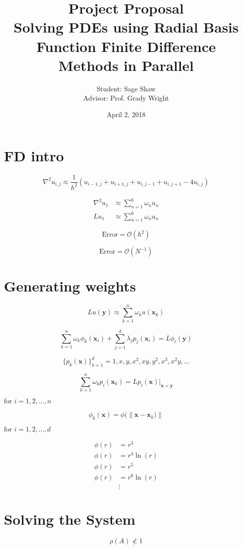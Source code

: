 \documentclass[12pt]{article}
\title{Project Proposal\\ \large Solving PDEs using Radial Basis Function Finite Difference Methods in Parallel}
\author{Student: Sage Shaw\\ Advisor: Prof. Grady Wright}
\date{April 2, 2018}
\newcommand{\norm}[1]{\left\lVert#1\right\rVert}
\let\vec\mathbf
\begin{document}
	\thispagestyle{empty}
	
	
\section{FD intro}

$$
\nabla^2u_{i,j} \approx \frac{1}{h^2}\left( u_{i-1,j} + u_{i+1, j} + u_{i, j-1} +u_{i, j+1} - 4u_{i,j} \right)
$$

\begin{align*}
	\nabla^2u_{1} & \approx \sum_{n=1}^6 \omega_n u_n \\
	Lu_{1} & \approx \sum_{n=1}^6 \omega_n u_n
\end{align*}

$$
\text{Error} = \mathcal{O}(h^2)
$$

$$
\text{Error} = \mathcal{O}(N^{-1})
$$



\section{Generating weights}
$$
Lu(\vec{y}) \approx \sum_{k=1}^n \omega_k u(\vec{x}_k)
$$

$$
\sum\limits_{k=1}^n \omega_k\phi_k(\vec{x}_i) + \sum\limits_{j=1}^d \lambda_j p_j(\vec{x}_i) = L\phi_i(\vec{y}) 
$$

$$
\{p_k(\vec{x})\}_{k=1}^d = 1, x, y, x^2, xy, y^2, x^3, x^2y, \dots
$$

$$
\sum\limits_{k=1}^n \omega_k p_i(\vec{x}_k) = Lp_i(\vec{x})\vert_{\vec{x}=\vec{y}}
$$

$\text{for } i=1,2,...,n$

$$
\phi_k(\vec{x}) = \phi(\norm{ \vec{x} - \vec{x}_k) }
$$

$\text{for } i=1,2,...,d$

\begin{align*}
	\phi(r) & = r^3 \\
	\phi(r) & = r^4 \ln(r) \\
	\phi(r) & = r^5 \\
	\phi(r) & = r^6 \ln(r) \\
	& \vdots
\end{align*}

	
\section{Solving the System}

$$
\rho(A) \nless 1
$$	
\end{document}
